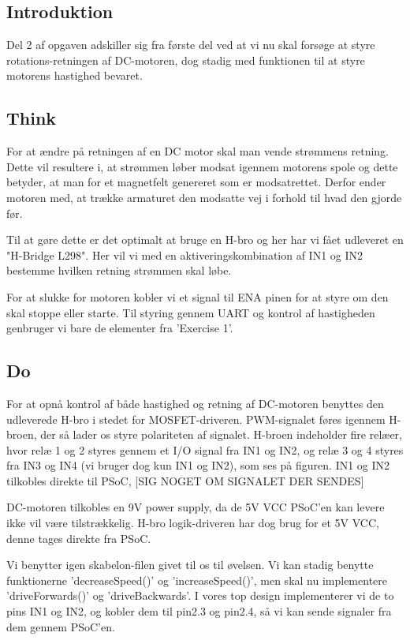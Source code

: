 \documentclass[../main.tex]{subfiles}
\begin{document}
\subsection{Introduktion}
Del 2 af opgaven adskiller sig fra første del ved at vi nu skal forsøge at styre rotations-retningen af DC-motoren, dog stadig med funktionen til at styre motorens hastighed bevaret.

\subsection{Think}
For at ændre på retningen af en DC motor skal man vende strømmens retning. 
Dette vil resultere i, at strømmen løber modsat igennem motorens spole og dette betyder, at man for et magnetfelt genereret som er modsatrettet.
Derfor ender motoren med, at trække armaturet den modsatte vej i forhold til hvad den gjorde før.

Til at gøre dette er det optimalt at bruge en H-bro og her har vi fået udleveret en "H-Bridge L298".
Her vil vi med en aktiveringskombination af IN1 og IN2 bestemme hvilken retning strømmen skal løbe.

For at slukke for motoren kobler vi et signal til ENA pinen for at styre om den skal stoppe eller starte. Til styring gennem UART og kontrol af hastigheden genbruger vi bare de elementer fra 'Exercise 1'.

\subsection{Do}
For at opnå kontrol af både hastighed og retning af DC-motoren benyttes den udleverede H-bro i stedet for MOSFET-driveren. PWM-signalet føres igennem H-broen, der så lader os styre polariteten af signalet. H-broen indeholder fire relæer, hvor relæ 1 og 2 styres gennem et I/O signal fra IN1 og IN2, og relæ 3 og 4 styres fra IN3 og IN4 (vi bruger dog kun IN1 og IN2), som ses på figuren. IN1 og IN2 tilkobles direkte til PSoC, [SIG NOGET OM SIGNALET DER SENDES]


DC-motoren tilkobles en 9V power supply, da de 5V VCC PSoC'en kan levere ikke vil være tilstrækkelig. H-bro logik-driveren har dog brug for et 5V VCC, denne tages direkte fra PSoC.

Vi benytter igen skabelon-filen givet til os til øvelsen. Vi kan stadig benytte funktionerne ’decreaseSpeed()’ og ’increaseSpeed()’, men skal nu implementere ’driveForwards()’ og ’driveBackwards’. I vores top design implementerer vi de to pins IN1 og IN2, og kobler dem til pin2.3 og pin2.4, så vi kan sende signaler fra dem gennem PSoC’en.
\end{document}
